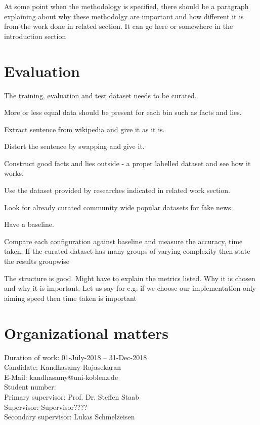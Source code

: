 \documentclass[a4paper, 11pt]{article}
\makeatletter
\newcommand{\myName}{Kandhasamy Rajasekaran}
\newcommand{\emailID}{kandhasamy@uni-koblenz.de}
\newcommand{\matriculationID}{216100855}
\newcommand{\StartDate}{01-July-2018}
\newcommand{\EndDate}{31-Dec-2018}
\newcommand{\expert}{Prof. Dr. Steffen Staab}%
\newcommand{\supervisor}{Supervisor????} %
\newcommand{\secondSupervisor}{Lukas Schmelzeisen} %
\makeatother
\begin{document}
At some point when the methodology is specified, there should be a paragraph explaining about why these methodolgy are important and how different it is from the work done in related section. It can go here or somewhere in the introduction section
\color{black}

\section{Evaluation}

The training, evaluation and test dataset needs to be curated. 

More or less equal data should be present for each bin such as facts and lies.

Extract sentence from wikipedia and give it as it is.

Distort the sentence by swapping and give it.

Construct good facts and lies outside - a proper labelled dataset and see how it works.

Use the dataset provided by researches indicated in related work section.

Look for already curated community wide popular datasets for fake news.

Have a baseline.

Compare each configuration against baseline and measure the accuracy, time taken. If the curated dataset has many groups of varying complexity then state the results groupwise


\color{red}
The structure is good. Might have to explain the metrics listed. Why it is chosen and why it is important. Let us say for e.g. if we choose our implementation only aiming speed then time taken is important
\color{black}

\newpage

\section{Organizational matters}

\begin{tabbing}
Duration of work: \hspace{1.1cm} \= \StartDate{} -- \EndDate{}\\
\vspace{0.5ex}Candidate:	\> \myName{}\\
\vspace{0.5ex}E-Mail:	\> \emailID{}\\
\vspace{0.5ex}Student number: \> \matriculationID{}\\
\vspace{0.5ex}Primary supervisor: \> \expert{}\\
Supervisor: \> \supervisor{}\\
Secondary supervisor: \> \secondSupervisor{}\\
\end{tabbing}
\end{document}
